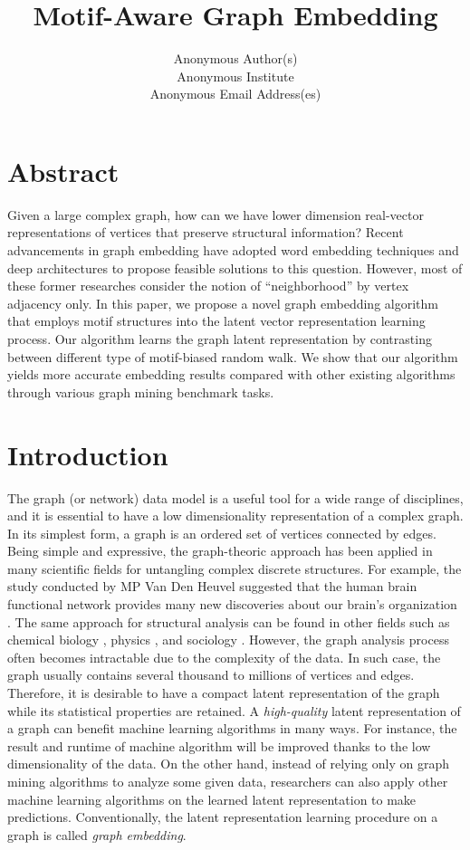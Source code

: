 \documentclass[letterpaper]{article}
\title{Motif-Aware Graph Embedding}
\author{
    Anonymous Author(s) \\
    Anonymous Institute \\
    Anonymous Email Address(es) \\
}
\begin{document}
    \maketitle

    \section{Abstract}
       Given a large complex graph, how can we have lower dimension real-vector representations 
       of vertices that preserve structural information? Recent advancements in graph embedding 
       have adopted word embedding techniques and deep architectures to propose feasible solutions
       to this question. However, most of these former researches consider the notion of ``neighborhood'' 
       by vertex adjacency only. In this paper, we propose a novel graph embedding algorithm that employs 
       motif structures into the latent vector representation learning process. Our algorithm learns 
       the graph latent representation by contrasting between different type of motif-biased random walk. 
       We show that our algorithm yields more accurate embedding results compared with other existing 
       algorithms through various graph mining benchmark tasks.

    \setcounter{secnumdepth}{2}
    \section{Introduction}
        The graph (or network) data model is a useful tool for a wide range of disciplines, and
        it is essential to have a low dimensionality representation of a complex graph. In its
        simplest form, a graph is an ordered set of vertices connected by edges. Being simple
        and expressive, the graph-theoric approach has been applied in many scientific fields
        for untangling complex discrete structures. For example, the study conducted by 
        MP Van Den Heuvel suggested that the human brain functional network provides many new
        discoveries about our brain's organization \cite{brainnetheuvel}. The same approach
        for structural analysis can be found in other fields such as chemical biology \cite{molecule}, 
        physics \cite{physicnet}, and sociology \cite{sociology}. However, the graph analysis
        process often becomes intractable due to the complexity of the data. In such case,
        the graph usually contains several thousand to millions of vertices and edges.
        Therefore, it is desirable to have a compact latent representation of the graph while
        its statistical properties are retained. A \emph{high-quality} latent representation
        of a graph can benefit machine learning algorithms in many ways. For instance, 
        the result and runtime of machine algorithm will be improved thanks to the low
        dimensionality of the data. On the other hand, instead of relying only on graph 
        mining algorithms to analyze some given data, researchers can also apply other
        machine learning algorithms on the learned latent representation to make predictions.
        Conventionally, the latent representation learning procedure on a graph is called
        \emph{graph embedding}.
\end{document}
